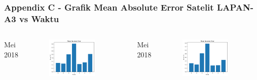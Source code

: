 \documentclass[8pt]{beamer}
\begin{document}
\begin{frame}
  \frametitle{Appendix C - Grafik Mean Absolute Error Satelit LAPAN-A3 vs Waktu}
  \begin{columns}[T]
     Mei 2018
      \begin{figure}
          \includegraphics[width=0.8\textwidth]{figure/mae_2018-05-19.png}
      \end{figure}
     Mei 2018
      \begin{figure}
          \includegraphics[width=0.8\textwidth]{figure/mae_2018-05-20.png}
      \end{figure}
  \end{columns}
\end{frame}
\end{document}

